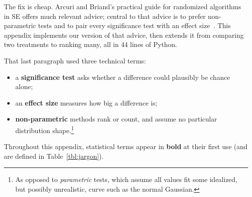 The fix is cheap.
Arcuri and Briand's practical guide for randomized algorithms
in SE offers much relevant advice; central to that advice is to
prefer non-parametric tests and to pair every significance test
with an effect size~\cite{arcuri11}.
This appendix implements our version of that advice, then
extends it from comparing two treatments to ranking many, all
in 44 lines of Python.

That last paragraph used three technical terms:
\begin{itemize}
\item a \textbf{significance test} asks whether a difference
  could plausibly be chance alone;
\item an \textbf{effect size} measures how big a difference is;
\item \textbf{non-parametric} methods rank or count, and assume
  no particular distribution shape.\footnote{As opposed to
  \emph{parametric} tests, which assume all values fit some
  idealized, but possibly unrealistic, curve such as the normal
  Gaussian.}
\end{itemize}
Throughout this appendix, statistical terms appear in
\textbf{bold} at their first use
(and are defined in Table~\ref{tbl:jargon}).

